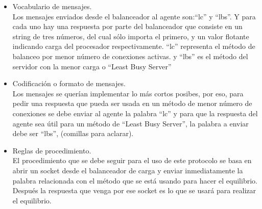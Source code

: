 \begin{itemize}
\begin{enumerate}
\end{enumerate}
\item Vocabulario de mensajes.\\
   Los mensajes enviados desde el balanceador al agente son:``lc'' y ``lbs''. Y para cada uno hay una respuesta por parte del balanceador que consiste
   en un string de tres números, del cual sólo importa el primero, y un valor flotante indicando carga del procesador respectivamente.
   ``lc'' representa el método de balanceo por menor número de conexiones activas. y ``lbs'' es el método del servidor con la menor carga o
   ``Least Busy Server''
\item Codificación o formato de mensajes.\\
    Los mensajes se querían implementar lo más cortos posibes, por eso, para pedir una respuesta que pueda ser usada en un método de menor número
    de conexiones se debe enviar al agente la palabra ``lc'' y para que la respuesta del agente sea útil para un método de ``Least Busy Server'', la palabra
    a enviar debe ser ``lbs'', (comillas para aclarar).
\item Reglas de procedimiento.\\
El procedimiento que se debe seguir para el uso de este protocolo se basa en abrir un socket desde el balanceador de carga y enviar inmediatamente
la palabra relacionada con el método que se está usando para hacer el equilibrio. Después la respuesta que venga por ese socket es lo que se usará
para realizar el equilibrio.

\end{itemize}